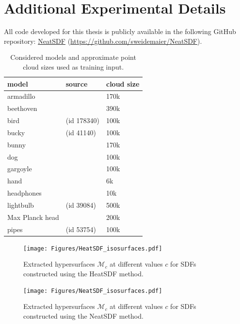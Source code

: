 \documentclass[12pt,openany]{book}
\theoremstyle{plainnormal}
\theoremstyle{remark}
\begin{document}
\chapter{Additional Experimental Details}
All code developed for this thesis is publicly available in the following GitHub repository: 
\href{https://github.com/sweidemaier/NeatSDF}{NeatSDF} 
(\url{https://github.com/sweidemaier/NeatSDF}).
\begin{table}
    \begin{tabular}{p{3.3cm} p{7cm} p{2.2cm}}
    \toprule
    \textbf{model} &\textbf{source}& \textbf{cloud size} \\
    \midrule
    armadillo &\cite{DBLP:conf/siggraph/KrishnamurthyL96} & 170k \\
    beethoven& \cite{threedscans}&390k \\
    bird & \cite{Thingi10k}  (id 178340)& 100k \\
        bucky & \cite{Thingi10k} (id 41140)& 100k\\
    bunny &\cite{DBLP:conf/siggraph/TurkL94} & 170k \\
    dog &\cite{dyke2020shrec} & 100k \\
    gargoyle&\cite{reconbenchmark}&100k\\
    hand &\cite{yeh2010template} & 6k\\
    headphones& \cite{giga-headphone}&10k\\
    lightbulb & \cite{Thingi10k} (id 39084) & 500k\\
    Max Planck head &\cite{Ivri2002divide} & 200k \\
    pipes&  \cite{Thingi10k} (id 53754) & 100k\\
    \bottomrule
\end{tabular}
    \caption{Considered models and approximate point cloud sizes used as training input. \label{tab:meshes}}
\end{table}
\begin{figure}
    \centering
    \texttt{[image: Figures/HeatSDF\_isosurfaces.pdf]}
    \caption{Extracted hypersurfaces $\mathcal{M}_c$ at different values $c$ for SDFs constructed using the HeatSDF method.}
\end{figure}
\begin{figure}
    \centering
    \texttt{[image: Figures/NeatSDF\_isosurfaces.pdf]}
    \caption{Extracted hypersurfaces $\mathcal{M}_c$ at different values $c$ for SDFs constructed using the NeatSDF method.}
\end{figure}
%
\end{document}
